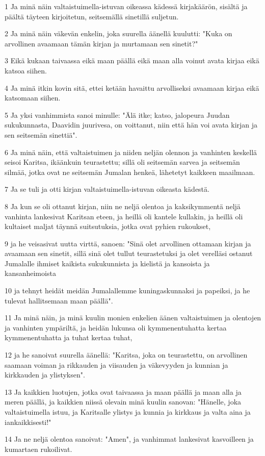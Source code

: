 \par 1 Ja minä näin valtaistuimella-istuvan oikeassa kädessä kirjakäärön, sisältä ja päältä täyteen kirjoitetun, seitsemällä sinetillä suljetun.
\par 2 Ja minä näin väkevän enkelin, joka suurella äänellä kuulutti: "Kuka on arvollinen avaamaan tämän kirjan ja murtamaan sen sinetit?"
\par 3 Eikä kukaan taivaassa eikä maan päällä eikä maan alla voinut avata kirjaa eikä katsoa siihen.
\par 4 Ja minä itkin kovin sitä, ettei ketään havaittu arvolliseksi avaamaan kirjaa eikä katsomaan siihen.
\par 5 Ja yksi vanhimmista sanoi minulle: "Älä itke; katso, jalopeura Juudan sukukunnasta, Daavidin juurivesa, on voittanut, niin että hän voi avata kirjan ja sen seitsemän sinettiä".
\par 6 Ja minä näin, että valtaistuimen ja niiden neljän olennon ja vanhinten keskellä seisoi Karitsa, ikäänkuin teurastettu; sillä oli seitsemän sarvea ja seitsemän silmää, jotka ovat ne seitsemän Jumalan henkeä, lähetetyt kaikkeen maailmaan.
\par 7 Ja se tuli ja otti kirjan valtaistuimella-istuvan oikeasta kädestä.
\par 8 Ja kun se oli ottanut kirjan, niin ne neljä olentoa ja kaksikymmentä neljä vanhinta lankesivat Karitsan eteen, ja heillä oli kantele kullakin, ja heillä oli kultaiset maljat täynnä suitsutuksia, jotka ovat pyhien rukoukset,
\par 9 ja he veisasivat uutta virttä, sanoen: "Sinä olet arvollinen ottamaan kirjan ja avaamaan sen sinetit, sillä sinä olet tullut teurastetuksi ja olet verelläsi ostanut Jumalalle ihmiset kaikista sukukunnista ja kielistä ja kansoista ja kansanheimoista
\par 10 ja tehnyt heidät meidän Jumalallemme kuningaskunnaksi ja papeiksi, ja he tulevat hallitsemaan maan päällä".
\par 11 Ja minä näin, ja minä kuulin monien enkelien äänen valtaistuimen ja olentojen ja vanhinten ympäriltä, ja heidän lukunsa oli kymmenentuhatta kertaa kymmenentuhatta ja tuhat kertaa tuhat,
\par 12 ja he sanoivat suurella äänellä: "Karitsa, joka on teurastettu, on arvollinen saamaan voiman ja rikkauden ja viisauden ja väkevyyden ja kunnian ja kirkkauden ja ylistyksen".
\par 13 Ja kaikkien luotujen, jotka ovat taivaassa ja maan päällä ja maan alla ja meren päällä, ja kaikkien niissä olevain minä kuulin sanovan: "Hänelle, joka valtaistuimella istuu, ja Karitsalle ylistys ja kunnia ja kirkkaus ja valta aina ja iankaikkisesti!"
\par 14 Ja ne neljä olentoa sanoivat: "Amen", ja vanhimmat lankesivat kasvoilleen ja kumartaen rukoilivat.

